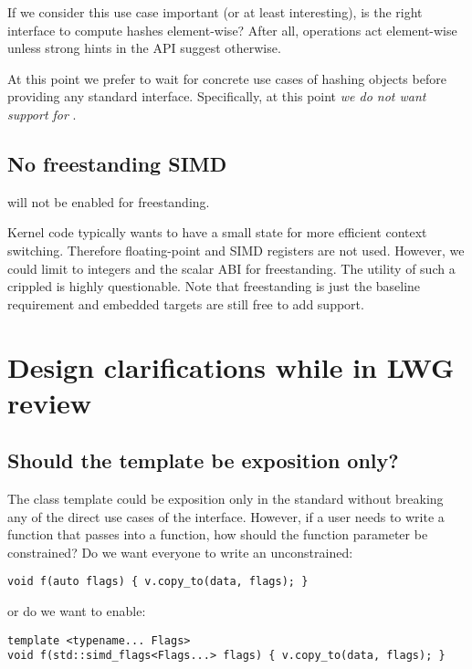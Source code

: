 If we consider this use case important (or at least interesting), is
\std{} the right interface to compute hashes element-wise?
After all,  operations act element-wise unless strong hints in the
API suggest otherwise.

At this point we prefer to wait for concrete use cases of hashing \simd objects
before providing any standard interface.
Specifically, at this point \emph{we do not want \std{} support for
\simd}.

\subsection{No freestanding SIMD}\label{sec:freestanding}

 will not be enabled for freestanding.

Kernel code typically wants to have a small state for more efficient
context switching.
Therefore floating-point and SIMD registers are not used.
However, we could limit \simd to integers and the scalar ABI for freestanding.
The utility of such a crippled \simd is highly questionable.
Note that freestanding is just the baseline requirement and embedded targets
are still free to add  support.

\section{Design clarifications while in LWG review}
\subsection{Should the  template be exposition only?}\label{sec:simd_flags-expos}

The  class template could be exposition only in the standard
without breaking any of the direct use cases of the \simd interface.
However, if a user needs to write a function that passes  into
a function, how should the function parameter be constrained?
Do we want everyone to write an unconstrained:
\medskip\begin{lstlisting}[style=Vc]
void f(auto flags) { v.copy_to(data, flags); }
\end{lstlisting}
or do we want to enable:
\medskip\begin{lstlisting}[style=Vc]
template <typename... Flags>
void f(std::simd_flags<Flags...> flags) { v.copy_to(data, flags); }
\end{lstlisting}

